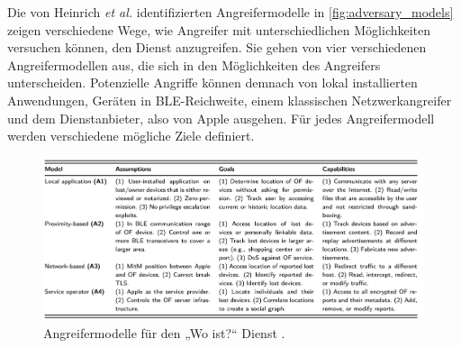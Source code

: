 Die von Heinrich \textit{et al.} \cite{Heinrich_FindMy} identifizierten Angreifermodelle in \autoref{fig:adversary_models} zeigen verschiedene Wege, wie Angreifer mit unterschiedlichen Möglichkeiten versuchen können, den Dienst anzugreifen.
Sie gehen von vier verschiedenen Angreifermodellen aus, die sich in den Möglichkeiten des Angreifers unterscheiden.
Potenzielle Angriffe können demnach von lokal installierten Anwendungen, Geräten in \ac{BLE}-Reichweite, einem klassischen Netzwerkangreifer und dem Dienstanbieter, also von Apple ausgehen.
Für jedes Angreifermodell werden verschiedene mögliche Ziele definiert.
\begin{figure}[ht]
  \centering
  \includegraphics[width=\textwidth]{img/adversary_models}
  \caption{Angreifermodelle für den „Wo ist?“ Dienst \cite{Heinrich_FindMy}.}
  \label{fig:adversary_models}
\end{figure}

